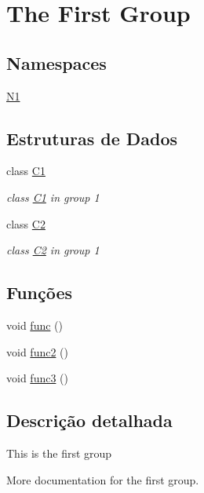 \hypertarget{group__group1}{\section{The First Group}
\label{group__group1}
}
\subsection*{Namespaces}
\begin{DoxyCompactItemize}
\item 
\hyperlink{namespace_n1}{N1}
\end{DoxyCompactItemize}
\subsection*{Estruturas de Dados}
\begin{DoxyCompactItemize}
\item 
class \hyperlink{class_c1}{C1}
\begin{DoxyCompactList}\small\item\em class \hyperlink{class_c1}{C1} in group 1 \end{DoxyCompactList}\item 
class \hyperlink{class_c2}{C2}
\begin{DoxyCompactList}\small\item\em class \hyperlink{class_c2}{C2} in group 1 \end{DoxyCompactList}\end{DoxyCompactItemize}
\subsection*{Funções}
\begin{DoxyCompactItemize}
\item 
void \hyperlink{group__group1_ga24f647174760cac13d2624b5ad74b00c}{func} ()
\item 
void \hyperlink{group__group1_ga053929c0809a5f56f7548fd7d9968f31}{func2} ()
\item 
void \hyperlink{group__group1_gadbf675591ff057ec48ce35b0d5cdf755}{func3} ()
\end{DoxyCompactItemize}


\subsection{Descrição detalhada}
This is the first group

More documentation for the first group. 

